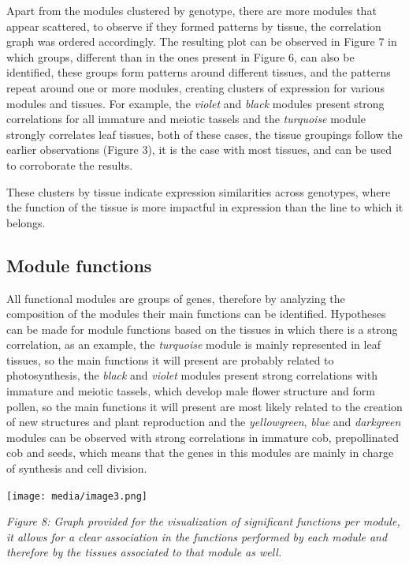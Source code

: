 \documentclass[
]{article}
\begin{document}
Apart from the modules clustered by genotype, there are more modules
that appear scattered, to observe if they formed patterns by tissue, the
correlation graph was ordered accordingly. The resulting plot can be
observed in Figure 7 in which groups, different than in the ones present
in Figure 6, can also be identified, these groups form patterns around
different tissues, and the patterns repeat around one or more modules,
creating clusters of expression for various modules and tissues. For
example, the \emph{violet} and \emph{black} modules present strong
correlations for all immature and meiotic tassels and the
\emph{turquoise} module strongly correlates leaf tissues, both of these
cases, the tissue groupings follow the earlier observations (Figure 3),
it is the case with most tissues, and can be used to corroborate the
results.

These clusters by tissue indicate expression similarities across
genotypes, where the function of the tissue is more impactful in
expression than the line to which it belongs.

\hypertarget{module-functions}{%
\subsection{Module functions}\label{module-functions}}

All functional modules are groups of genes, therefore by analyzing the
composition of the modules their main functions can be identified.
Hypotheses can be made for module functions based on the tissues in
which there is a strong correlation, as an example, the \emph{turquoise}
module is mainly represented in leaf tissues, so the main functions it
will present are probably related to photosynthesis, the \emph{black}
and \emph{violet} modules present strong correlations with immature and
meiotic tassels, which develop male flower structure and form pollen, so
the main functions it will present are most likely related to the
creation of new structures and plant reproduction and the
\emph{yellowgreen}, \emph{blue} and \emph{darkgreen} modules can be
observed with strong correlations in immature cob, prepollinated cob and
seeds, which means that the genes in this modules are mainly in charge
of synthesis and cell division.

\texttt{[image: media/image3.png]}

\emph{Figure 8: Graph provided for the visualization of significant
functions per module, it allows for a clear association in the functions
performed by each module and therefore by the tissues associated to that
module as well.}
\end{document}
